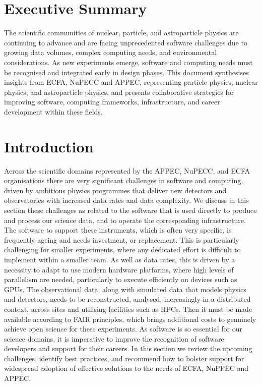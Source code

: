 \section{Executive Summary}

The scientific communities of nuclear, particle, and astroparticle physics are continuing to advance and are facing unprecedented software challenges due to growing data volumes, complex computing needs, and environmental considerations. As new experiments emerge, software and computing needs must be recognised and integrated early in design phases. This document synthesises insights from ECFA, NuPECC and APPEC, representing particle physics, nuclear physics, and astroparticle physics, and presents collaborative strategies for improving software, computing frameworks, infrastructure, and career development within these fields.


\section{Introduction}

Across the scientific domains represented by the APPEC, NuPECC, and ECFA organisations there are very significant challenges in software and computing, driven by ambitious physics programmes that deliver new detectors and observatories with increased data rates and data complexity. We discuss in this section these challenges as related to the software that is used directly to produce and process our science data, and to operate the corresponding infrastructure. The software to support these instruments, which is often very specific, is frequently ageing and needs investment, or replacement. This is particularly challenging for smaller experiments, where any dedicated effort is difficult to implement within a smaller team. As well as data rates, this is driven by a necessity to adapt to use modern hardware platforms, where high levels of parallelism are needed, particularly to execute efficiently on devices such as GPUs. The observational data, along with simulated data that models physics and detectors, needs to be reconstructed, analysed, increasingly in a distributed context, across sites and utilising facilities such as HPCs. Then it must be made available according to FAIR principles, which brings additional costs to genuinely achieve open science for these experiments. As software is so essential for our science domains, it is imperative to improve the recognition of software developers and support for their careers.
In this section we review the upcoming challenges, identify best practices, and recommend how to bolster support for widespread adoption of effective solutions to the needs of ECFA, NuPPEC and APPEC.


